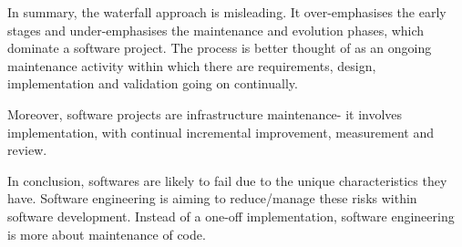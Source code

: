 \documentclass[a4paper, openany]{memoir}
\begin{document}
In summary, the waterfall approach is misleading. It over-emphasises the early stages and under-emphasises the maintenance and evolution phases, which dominate a software project. The process is better thought of as an ongoing maintenance activity within which there are requirements, design, implementation and validation going on continually.

Moreover, software projects are infrastructure maintenance- it involves implementation, with continual incremental improvement, measurement and review.

In conclusion, softwares are likely to fail due to the unique characteristics they have. Software engineering is aiming to reduce/manage these risks within software development. Instead of a one-off implementation, software engineering is more about maintenance of code.
\end{document}
